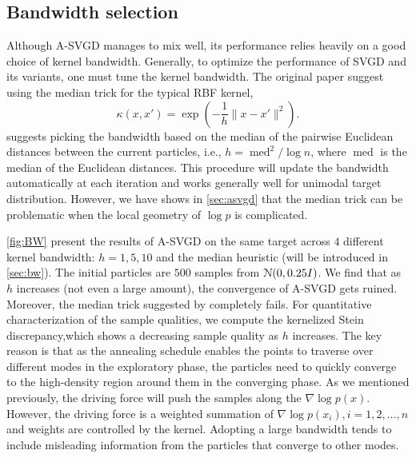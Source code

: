 \subsection{Bandwidth selection} \label{sec:bwselection}

Although A-SVGD manages to mix well, its performance relies heavily on a
good choice of kernel bandwidth. Generally, to optimize the performance of SVGD and its variants, one must tune the kernel bandwidth. The original paper \citep{liu2016stein} suggest using the median trick for the typical RBF kernel,
\[
   \kappa(x, x') = \exp(-\frac{1}{h} \|x - x'\|^2). 
\]
\citet{liu2016stein} suggests picking the bandwidth based on the median of the pairwise Euclidean distances between the current particles, i.e., $h=\operatorname{med}^{2} / \log n$, where $\operatorname{med}$ is the median of the Euclidean distances. This procedure will update the bandwidth automatically at each iteration and works generally well for unimodal target distribution. However, we have shows in \cref{sec:asvgd} that the median trick can be problematic when the local geometry of $\log p$ is complicated.

\cref{fig:BW} present the results of A-SVGD
on the same target across $4$ different kernel bandwidth: $h = 1, 5, 10$ and
the median heuristic (will be introduced in \cref{sec:bw}). The initial
particles are $500$ \iid samples from $\mathcal{N}(0, 0.25I)$. We find that as
$h$ increases (not even a large amount), the convergence of A-SVGD gets
ruined. Moreover, the median trick suggested by \citet{liu2016stein}
completely fails. For quantitative characterization of the sample qualities,
we compute the kernelized Stein discrepancy,which shows a decreasing sample
quality as $h$ increases. The key reason is that as the annealing schedule
enables the points to traverse over different modes in the exploratory phase,
the particles need to quickly converge to the high-density region around them
in the converging phase. As we mentioned previously, the driving force will
push the samples along the $\nabla \log p(x)$. However, the driving force is
a weighted summation of $\nabla \log p(x_i), i=1, 2, \dots, n$ and weights
are controlled by the kernel. Adopting a large bandwidth tends to include
misleading information from the particles that converge to other modes.


